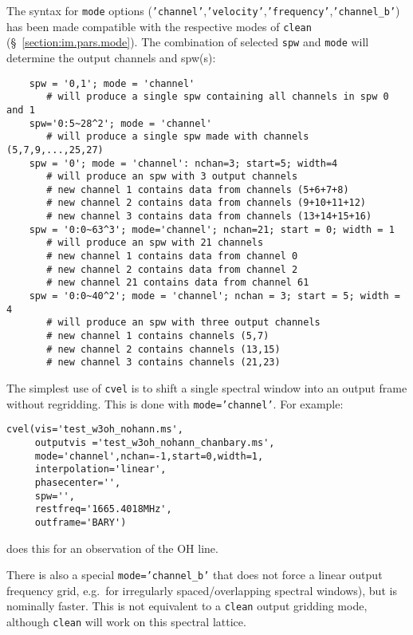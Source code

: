 The syntax for {\tt mode} options 
({\tt 'channel'},{\tt 'velocity'},{\tt 'frequency'},{\tt 'channel\_b'})
has been made compatible with the
respective modes of {\tt clean} (\S~\ref{section:im.pars.mode}).  The
combination of selected {\tt spw} and {\tt mode} will determine the
output channels and spw(s):
\small
\begin{verbatim}
    spw = '0,1'; mode = 'channel'
       # will produce a single spw containing all channels in spw 0 and 1
    spw='0:5~28^2'; mode = 'channel'
       # will produce a single spw made with channels (5,7,9,...,25,27)
    spw = '0'; mode = 'channel': nchan=3; start=5; width=4
       # will produce an spw with 3 output channels
       # new channel 1 contains data from channels (5+6+7+8)
       # new channel 2 contains data from channels (9+10+11+12)
       # new channel 3 contains data from channels (13+14+15+16)
    spw = '0:0~63^3'; mode='channel'; nchan=21; start = 0; width = 1
       # will produce an spw with 21 channels
       # new channel 1 contains data from channel 0
       # new channel 2 contains data from channel 2
       # new channel 21 contains data from channel 61
    spw = '0:0~40^2'; mode = 'channel'; nchan = 3; start = 5; width = 4
       # will produce an spw with three output channels
       # new channel 1 contains channels (5,7)
       # new channel 2 contains channels (13,15)
       # new channel 3 contains channels (21,23)
\end{verbatim}
\normalsize

The simplest use of {\tt cvel} is to shift a single spectral window
into an output frame without regridding.  This is done with 
{\tt mode='channel'}.  For example:
\small
\begin{verbatim}
cvel(vis='test_w3oh_nohann.ms',
     outputvis ='test_w3oh_nohann_chanbary.ms',
     mode='channel',nchan=-1,start=0,width=1,
     interpolation='linear',
     phasecenter='',
     spw='',
     restfreq='1665.4018MHz',
     outframe='BARY')
\end{verbatim}
\normalsize
does this for an observation of the OH line.

There is also a special {\tt mode='channel\_b'} that does not force a
linear output frequency grid, e.g.\ for irregularly spaced/overlapping
spectral windows), but is nominally faster.  This is not equivalent to
a {\tt clean} output gridding mode, although {\tt clean} will
work on this spectral lattice.

